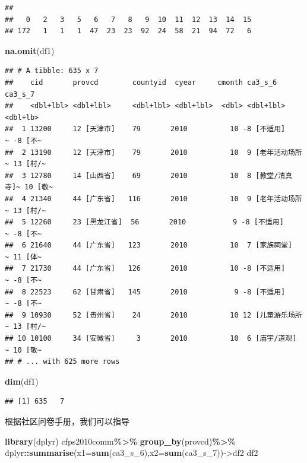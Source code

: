 \documentclass[
  oneside]{book}
\newenvironment{Shaded}{\begin{snugshade}}{\end{snugshade}}
\newcommand{\AttributeTok}[1]{\textcolor[rgb]{0.13,0.29,0.53}{#1}}
\newcommand{\FunctionTok}[1]{\textcolor[rgb]{0.13,0.29,0.53}{\textbf{#1}}}
\newcommand{\NormalTok}[1]{#1}
\newcommand{\OtherTok}[1]{\textcolor[rgb]{0.56,0.35,0.01}{#1}}
\newcommand{\SpecialCharTok}[1]{\textcolor[rgb]{0.81,0.36,0.00}{\textbf{#1}}}
\begin{document}
\begin{verbatim}
## 
##   0   2   3   5   6   7   8   9  10  11  12  13  14  15 
## 172   1   1   1  47  23  23  92  24  58  21  94  72   6
\end{verbatim}

\begin{Shaded}
\begin{Highlighting}[]
\FunctionTok{na.omit}\NormalTok{(df1)}
\end{Highlighting}
\end{Shaded}

\begin{verbatim}
## # A tibble: 635 x 7
##    cid       provcd        countyid  cyear     cmonth ca3_s_6           ca3_s_7 
##    <dbl+lbl> <dbl+lbl>     <dbl+lbl> <dbl+lbl>  <dbl> <dbl+lbl>         <dbl+lb>
##  1 13200     12 [天津市]    79       2010          10 -8 [不适用]     ~ -8 [不~
##  2 13190     12 [天津市]    79       2010          10  9 [老年活动场所~ 13 [村/~
##  3 12780     14 [山西省]    69       2010          10  8 [教堂/清真寺]~ 10 [敬~
##  4 21340     44 [广东省]   116       2010          10  9 [老年活动场所~ 13 [村/~
##  5 12260     23 [黑龙江省]  56       2010           9 -8 [不适用]     ~ -8 [不~
##  6 21640     44 [广东省]   123       2010          10  7 [家族祠堂]   ~ 11 [体~
##  7 21730     44 [广东省]   126       2010          10 -8 [不适用]     ~ -8 [不~
##  8 22523     62 [甘肃省]   145       2010           9 -8 [不适用]     ~ -8 [不~
##  9 10930     52 [贵州省]    24       2010          10 12 [儿童游乐场所~ 13 [村/~
## 10 10100     34 [安徽省]     3       2010          10  6 [庙宇/道观]  ~ 10 [敬~
## # ... with 625 more rows
\end{verbatim}

\begin{Shaded}
\begin{Highlighting}[]
\FunctionTok{dim}\NormalTok{(df1)}
\end{Highlighting}
\end{Shaded}

\begin{verbatim}
## [1] 635   7
\end{verbatim}

根据社区问卷手册，我们可以指导

\begin{Shaded}
\begin{Highlighting}[]
\FunctionTok{library}\NormalTok{(dplyr)}
\NormalTok{cfps2010comm}\SpecialCharTok{\%\textgreater{}\%}
  \FunctionTok{group\_by}\NormalTok{(provcd)}\SpecialCharTok{\%\textgreater{}\%}
\NormalTok{  dplyr}\SpecialCharTok{::}\FunctionTok{summarise}\NormalTok{(}\AttributeTok{x1=}\FunctionTok{sum}\NormalTok{(ca3\_s\_6),}\AttributeTok{x2=}\FunctionTok{sum}\NormalTok{(ca3\_s\_7))}\OtherTok{{-}\textgreater{}}\NormalTok{df2}
\NormalTok{df2}
\end{Highlighting}
\end{Shaded}
\end{document}
